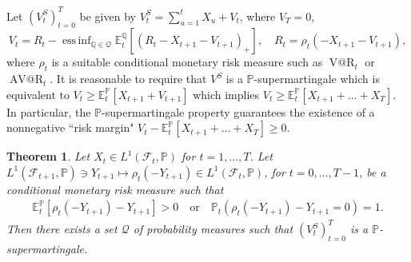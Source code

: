 \documentclass[11pt,a4paper]{article}
\makeatletter
\newtheorem{theorem}{Theorem}
\newcommand{\E}{\mathbb{E}}
\newcommand{\VaR}{\operatorname{V@R}}
\newcommand{\AVaR}{\operatorname{AV@R}}
\DeclareMathOperator*{\essinf}{ess\,inf}
\renewcommand{\P}{\mathbb{P}}
\newcommand{\Q}{\mathbb{Q}}
\newcommand{\calF}{\mathcal{F}}
\newcommand{\calQ}{\mathcal{Q}}
\makeatother
\begin{document}
Let $(V^S_t)_{t=0}^T$ be given by $V^S_t=\sum_{u=1}^t X_u + V_t$, where $V_T=0$, 
$$
V_t=R_t-\essinf_{\Q\in\mathcal{Q}}\E^{\Q}_t[(R_t-X_{t+1}-V_{t+1})_+], \quad R_t=\rho_t(-X_{t+1}-V_{t+1}),
$$
where $\rho_t$ is a suitable conditional monetary risk measure such as $\VaR_t$ or $\AVaR_t$.
It is reasonable to require that $V^S$ is a $\P$-supermartingale which is equivalent to $V_t\geq \E^{\P}_t[X_{t+1}+V_{t+1}]$ which implies $V_t\geq \E^{\P}_t[X_{t+1}+\dots+X_{T}]$. In particular, the $\P$-supermartingale property guarantees the existence of a nonnegative ``risk margin" 
$V_t-\E^{\P}_t[X_{t+1}+\dots+X_{T}]\geq 0$.

\begin{theorem}\label{thm:Vsupermartingale}
Let $X_t\in L^1(\calF_t,\P)$ for $t=1,\dots,T$. Let $L^1(\calF_{t+1},\P)\ni Y_{t+1}\mapsto \rho_t(-Y_{t+1})\in L^1(\calF_{t},\P)$, for $t=0,\dots,T-1$, be a conditional monetary risk measure such that 
\begin{align}\label{eq:crm_cond}
\E^{\P}_t[\rho_t(-Y_{t+1})-Y_{t+1}]>0 \quad\text{or}\quad \P_t(\rho_t(-Y_{t+1})-Y_{t+1}=0)=1.
\end{align} 
Then there exists a set $\calQ$ of probability measures such that $(V^S_t)_{t=0}^{T}$ is a $\P$-supermartingale.  
\end{theorem}
\end{document}
